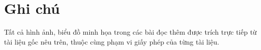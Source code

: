 \section*{Ghi chú}

Tất cả hình ảnh, biểu đồ minh họa trong các bài đọc thêm được trích trực tiếp từ tài liệu gốc nêu trên, thuộc cùng phạm vi giấy phép của từng tài liệu.
